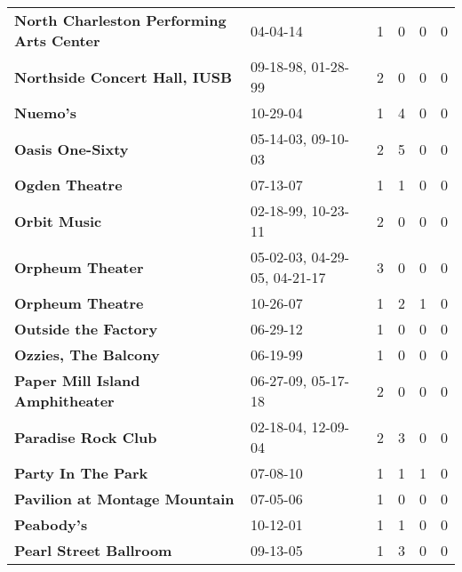 \begin{supertabular}{llllll}
                     \textbf{North Charleston Performing Arts Center} &                      04-04-14 &  1 &   0 &  0 &  0 \\
                                \textbf{Northside Concert Hall, IUSB} &            09-18-98, 01-28-99 &  2 &   0 &  0 &  0 \\
                                                     \textbf{Nuemo's} &                      10-29-04 &  1 &   4 &  0 &  0 \\
                                             \textbf{Oasis One-Sixty} &            05-14-03, 09-10-03 &  2 &   5 &  0 &  0 \\
                                               \textbf{Ogden Theatre} &                      07-13-07 &  1 &   1 &  0 &  0 \\
                                                 \textbf{Orbit Music} &            02-18-99, 10-23-11 &  2 &   0 &  0 &  0 \\
                                             \textbf{Orpheum Theater} &  05-02-03, 04-29-05, 04-21-17 &  3 &   0 &  0 &  0 \\
                                             \textbf{Orpheum Theatre} &                      10-26-07 &  1 &   2 &  1 &  0 \\
                                         \textbf{Outside the Factory} &                      06-29-12 &  1 &   0 &  0 &  0 \\
                                         \textbf{Ozzies, The Balcony} &                      06-19-99 &  1 &   0 &  0 &  0 \\
                              \textbf{Paper Mill Island Amphitheater} &            06-27-09, 05-17-18 &  2 &   0 &  0 &  0 \\
                                          \textbf{Paradise Rock Club} &            02-18-04, 12-09-04 &  2 &   3 &  0 &  0 \\
                                           \textbf{Party In The Park} &                      07-08-10 &  1 &   1 &  1 &  0 \\
                                \textbf{Pavilion at Montage Mountain} &                      07-05-06 &  1 &   0 &  0 &  0 \\
                                                   \textbf{Peabody's} &                      10-12-01 &  1 &   1 &  0 &  0 \\
                                       \textbf{Pearl Street Ballroom} &                      09-13-05 &  1 &   3 &  0 &  0 \\

\end{supertabular}
